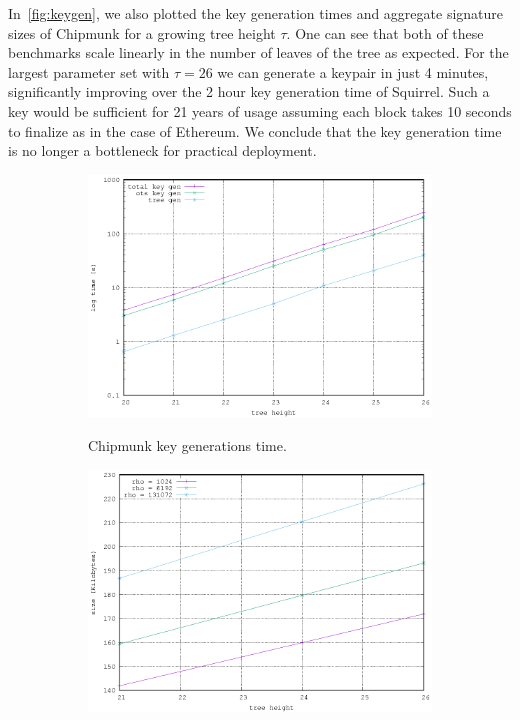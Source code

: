 In~\autoref{fig:keygen}, we also plotted the key generation times and aggregate signature sizes of Chipmunk for a growing tree height $\tau$.
One can see that both of these benchmarks scale linearly in the number of leaves of the tree as expected.
For the largest parameter set with $\tau = 26$ we can generate a keypair in just 4 minutes, significantly improving over the 2 hour key generation time of Squirrel.
Such a key would be sufficient for 21 years of usage assuming each block takes 10 seconds to finalize as in the case of Ethereum. 
We conclude that the key generation time is no longer a bottleneck for practical deployment.
\begin{figure}
  \centering
  \begin{subfigure}[b]
  {0.49\textwidth}    \centering
  \includegraphics[trim={1mm 0 4mm 0},clip,width=\textwidth]{figures/key_gen.eps}\\
  \caption{Chipmunk key generations time.}
  \end{subfigure}
\begin{subfigure}[b]{0.49\textwidth}    \centering
  \includegraphics[trim={1mm 0 4mm 0},clip,width=\textwidth]{figures/sig_size.eps}\\

\end{subfigure}
\end{figure}
